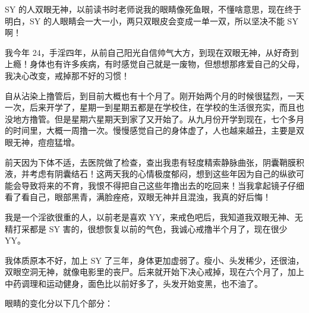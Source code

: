\begin{case}[眼睛]
    SY 的人双眼无神，以前读书时老师说我的眼睛像死鱼眼，不懂啥意思，现在终于明白，SY 的人眼睛会一大一小，两只双眼皮会变成一单一双，所以坚决不能 SY 啊！
\end{case}

\begin{case}[眼睛]
    我今年 24，手淫四年，从前自己阳光自信帅气大方，到现在双眼无神，从好奇到上瘾！身体也有许多疾病，有时感觉自己就是一废物，但想想那疼爱自己的父母，我决心改变，戒掉那不好的习惯！
\end{case}

\begin{case}[眼睛]
    自从沾染上撸管后，到目前大概也有十个月了。刚开始两个月的时候很猛烈，一天一次，后来开学了，星期一到星期五都是在学校住，在学校的生活很充实，而且也没地方撸管。但是星期六星期天到家了又开始了。从九月份开学到现在，七个多月的时间里，大概一周撸一次。慢慢感觉自己的身体虚了，人也越来越丑，主要是双眼无神，痘痘猛增。
\end{case}

\begin{case}[眼睛]
    前天因为下体不适，去医院做了检查，查出我患有轻度精索静脉曲张，阴囊鞘膜积液，并考虑有阴囊结石！这两天我的心情极度郁闷，想到这些年因为自己的纵欲可能会导致将来的不育，我恨不得把自己这些年撸出去的吃回来！当我拿起镜子仔细看了看自己，眼部黑青，满脸痤疮，双眼无神并且混浊，我真的好后悔！
\end{case}

\begin{case}[眼睛]
    我是一个淫欲很重的人，以前老是喜欢 YY，来戒色吧后，我知道我双眼无神、无精打采都是 SY 害的，很想恢复以前的气色，我诚心戒撸半个月了，现在很少 YY。
\end{case}

\begin{case}[眼睛]
    我体质原本不好，加上 SY 了三年，身体更加虚弱了。瘦小、头发稀少，还很油，双眼空洞无神，就像电影里的丧尸。后来就开始下决心戒掉，现在六个月了，加上中药调理和运动健身，面色比以前好多了，头发开始变黑，也不油了。
\end{case}

眼睛的变化分以下几个部分：

